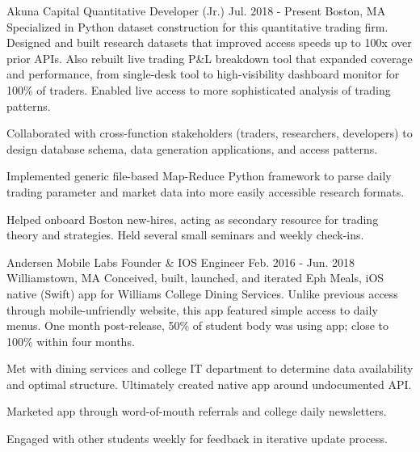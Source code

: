 

\begin{cventries}
  \cventry
    {Akuna Capital}
    {Quantitative Developer (Jr.)}
    {Jul. 2018 - Present} %
    {Boston, MA} %
    {Specialized in Python dataset construction for this quantitative trading
    firm. Designed and built research datasets that improved access speeds up to
    100x over prior APIs. Also rebuilt live trading P\&L breakdown tool that
    expanded coverage and performance, from single-desk tool to high-visibility
    dashboard monitor for 100\% of traders. Enabled live access to more
    sophisticated analysis of trading patterns.}
    {\begin{cvitems} %
      \item Collaborated with cross-function stakeholders (traders,
            researchers, developers) to design database schema, data
            generation applications, and access patterns.
      \item Implemented generic file-based Map-Reduce Python framework to
            parse daily trading parameter and market data into more easily
            accessible research formats.
      \item Helped onboard Boston new-hires, acting as secondary resource
            for trading theory and strategies. Held several small seminars and
            weekly check-ins.
    \end{cvitems}}

\cventry
{Andersen Mobile Labs} %
{Founder \& IOS Engineer} %
{Feb. 2016 - Jun. 2018} %
{Williamstown, MA} %
{Conceived, built, launched, and iterated Eph Meals, iOS native (Swift) app for
Williams College Dining Services. Unlike previous access through
mobile-unfriendly website, this app featured simple access to daily menus. One
month post-release, 50\% of student body was using app; close to 100\% within
four months.}
{\begin{cvitems} %
\item Met with dining services and college IT department to determine data
availability and optimal structure. Ultimately created native app around
undocumented API.
\item Marketed app through word-of-mouth referrals and college daily
newsletters.
\item Engaged with other students weekly for feedback in iterative update
process.
\end{cvitems}}


\end{cventries}
